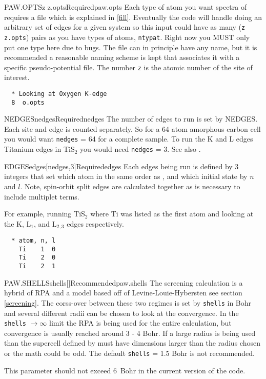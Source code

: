 \documentclass[11pt]{report}
\begin{document}
\begin{Card}{PAW.OPTS}{z z.opts}{Required}{paw.opts}
Each type of atom you want spectra of requires a  file which is explained in \ref{fill}. Eventually the code will handle doing an arbitrary set of edges for a given system so this input could have as many (\texttt{z} \texttt{z.opts}) pairs as you have types of atoms, \texttt{ntypat}. Right now you MUST only put one type here due to bugs. The file  can in principle have any name, but it is recommended a reasonable naming scheme is kept that associates it with a specific pseudo-potential file. The number \texttt{z} is the atomic number of the site of interest.

\begin{verbatim}
  * Looking at Oxygen K-edge
  8  o.opts
\end{verbatim}
\end{Card}

\begin{Card}{NEDGES}{nedges}{Required}{nedges}
The number of edges to run is set by NEDGES. Each site and edge is counted separately. So for a 64 atom amorphous carbon cell you would want \texttt{nedges} = 64 for a complete sample. To run the K and L edges Titanium edges in TiS$_2$ you would need \texttt{nedges} = 3. See also .
\end{Card}

\begin{Card}{EDGES}{edges[nedges,3]}{Required}{edges}
Each edges being run is defined by 3 integers that set which atom in the same order as , and which initial state by $n$ and $l$. Note, spin-orbit split edges are calculated together as is necessary to include multiplet terms.

For example, running TiS$_2$ where Ti was listed as the first atom and looking at the K, L$_1$, and L$_{2,3}$ edges respectively.
\begin{verbatim}
  * atom, n, l
    Ti    1  0
    Ti    2  0
    Ti    2  1
\end{verbatim}
\end{Card}

\begin{Card}{PAW.SHELLS}{shells[]}{Recommended}{paw.shells}
The screening calculation is a hybrid of RPA and a model based off of Levine-Louie-Hybersten see section \ref{screening}. The corss-over between these two regimes is set by \texttt{shells} in Bohr and several different radii can be chosen to look at the convergence. In the \texttt{shells} $\rightarrow \infty$ limit the RPA is being used for the entire calculation, but convergence is usually reached around 3 - 4 Bohr. If a large radius is being used than the supercell defined by  must have dimensions larger than the radius chosen or the math could be odd. The default \texttt{shells} = 1.5 Bohr is not recommended.

This parameter should not exceed 6~Bohr in the current version of the code.
\end{Card}
\end{document}
